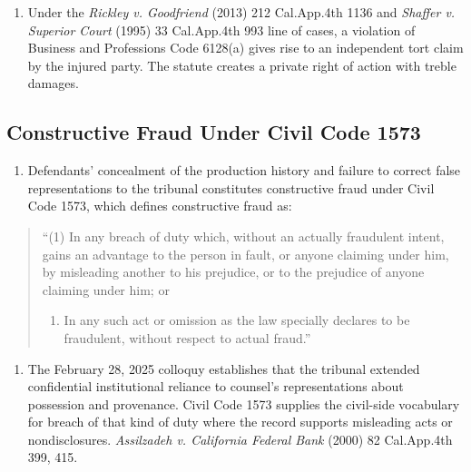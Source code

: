 \begin{enumerate}
\def\labelenumi{\arabic{enumi}.}
\setcounter{enumi}{18}
\tightlist
\item
  Under the \emph{Rickley v. Goodfriend} (2013) 212 Cal.App.4th 1136 and \emph{Shaffer v. Superior Court} (1995) 33 Cal.App.4th 993 line of cases, a violation of Business and Professions Code \textsection{} 6128(a) gives rise to an independent tort claim by the injured party. The statute creates a private right of action with treble damages.
\end{enumerate}

\subsection{Constructive Fraud Under Civil Code \textsection{} 1573}\label{constructive-fraud-under-civil-code-1573}

\begin{enumerate}
\def\labelenumi{\arabic{enumi}.}
\setcounter{enumi}{19}
\tightlist
\item
  Defendants' concealment of the production history and failure to correct false representations to the tribunal constitutes constructive fraud under Civil Code \textsection{} 1573, which defines constructive fraud as:
\end{enumerate}

\begin{quote}
``(1) In any breach of duty which, without an actually fraudulent intent, gains an advantage to the person in fault, or anyone claiming under him, by misleading another to his prejudice, or to the prejudice of anyone claiming under him; or

\begin{enumerate}
\def\labelenumi{(\arabic{enumi})}
\setcounter{enumi}{1}
\tightlist
\item
  In any such act or omission as the law specially declares to be fraudulent, without respect to actual fraud.''
\end{enumerate}
\end{quote}

\begin{enumerate}
\def\labelenumi{\arabic{enumi}.}
\setcounter{enumi}{20}
\tightlist
\item
  The February 28, 2025 colloquy establishes that the tribunal extended confidential institutional reliance to counsel's representations about possession and provenance. Civil Code \textsection{} 1573 supplies the civil-side vocabulary for breach of that kind of duty where the record supports misleading acts or nondisclosures. \emph{Assilzadeh v. California Federal Bank} (2000) 82 Cal.App.4th 399, 415.
\end{enumerate}

